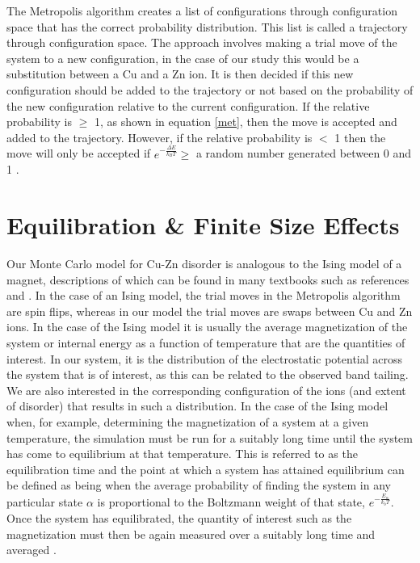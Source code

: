 The Metropolis algorithm creates a list of configurations through configuration space that has the correct probability distribution. This list is called a trajectory through configuration space. The approach involves making a trial move of the system to a new configuration, in the case of our study this would be a substitution between a Cu and a Zn ion. It is then decided if this new configuration should be added to the trajectory or not based on the probability of the new configuration relative to the current configuration. If the relative probability is  $\geq$ 1, as shown in equation \ref{met}, then the move is accepted and added to the trajectory. However, if the relative probability is $<$ 1 then the move will only be accepted if $e^{-\frac{\Delta E}{k_BT}} \ge$ a random number generated between 0 and 1 \cite{Lesar3}.


\section{Equilibration \& Finite Size Effects}
Our Monte Carlo model for Cu-Zn disorder is analogous to the Ising model of a magnet, descriptions of which can be found in many textbooks such as references  and . In the case of an Ising model, the trial moves in the Metropolis algorithm are spin flips, whereas in our model the trial moves are swaps between Cu and Zn ions. In the case of the Ising model it is usually the average magnetization of the system or internal energy as a function of temperature that are the quantities of interest. In our system, it is the distribution of the electrostatic potential across the system that is of interest, as this can be related to the observed band tailing. We are also interested in the corresponding configuration of the ions (and extent of disorder) that results in such a distribution. In the case of the Ising model when, for example, determining the magnetization of a system at a given temperature, the simulation must be run for a suitably long time until the system has come to equilibrium at that temperature. This is referred to as the equilibration time and the point at which a system has attained equilibrium can be defined as being when the average probability of finding the system in any particular state $\alpha$ is proportional to the Boltzmann weight of that state, $e^{-\frac{E_\alpha}{k_bT}}$. Once the system has equilibrated, the quantity of interest such as the magnetization must then be again measured over a suitably long time and averaged \cite{MC}.

